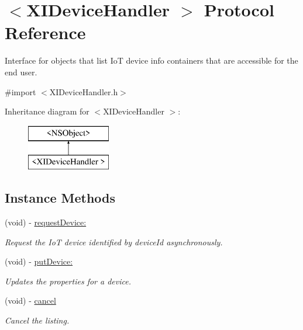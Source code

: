 \hypertarget{protocol_x_i_device_handler_01-p}{}\section{$<$X\+I\+Device\+Handler $>$ Protocol Reference}
\label{protocol_x_i_device_handler_01-p}


Interface for objects that list IoT device info containers that are accessible for the end user.  




{\ttfamily \#import $<$X\+I\+Device\+Handler.\+h$>$}

Inheritance diagram for $<$X\+I\+Device\+Handler $>$\+:\begin{figure}[H]
\begin{center}
\leavevmode
\includegraphics[height=2.000000cm]{protocol_x_i_device_handler_01-p}
\end{center}
\end{figure}
\subsection*{Instance Methods}
\begin{DoxyCompactItemize}
\item 
(void) -\/ \hyperlink{protocol_x_i_device_handler_01-p_a03714ca27ff2c98b10bfec118c4a0ee7}{request\+Device\+:}
\begin{DoxyCompactList}\small\item\em Request the IoT device identified by device\+Id asynchronously. \end{DoxyCompactList}\item 
(void) -\/ \hyperlink{protocol_x_i_device_handler_01-p_aef8e4bb0c2696266b8172f8d10743bd0}{put\+Device\+:}
\begin{DoxyCompactList}\small\item\em Updates the properties for a device. \end{DoxyCompactList}\item 
(void) -\/ \hyperlink{protocol_x_i_device_handler_01-p_ae7df43032c98224e1a8213f0066cfc3d}{cancel}
\begin{DoxyCompactList}\small\item\em Cancel the listing. \end{DoxyCompactList}\end{DoxyCompactItemize}
